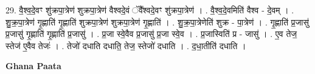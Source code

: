 \documentclass[17pt]{extarticle}
\begin{document}
29. वै॒श्व॒दे॒वꣳ शु॑क्रपा॒त्रेण॑ शुक्रपा॒त्रेण॑ वैश्वदे॒वं ॅवै᳚श्वदे॒वꣳ शु॑क्रपा॒त्रेण॑ । . वै॒श्व॒दे॒वमिति॑ वैश्व - दे॒वम् । . शु॒क्र॒पा॒त्रेण॑ गृ॒ह्णाति॑ गृ॒ह्णाति॑ शुक्रपा॒त्रेण॑ शुक्रपा॒त्रेण॑ गृ॒ह्णाति॑ । . शु॒क्र॒पा॒त्रेणेति॑ शुक्र - पा॒त्रेण॑ । . गृ॒ह्णाति॑ प्र॒जासु॑ प्र॒जासु॑ गृ॒ह्णाति॑ गृ॒ह्णाति॑ प्र॒जासु॑ । . प्र॒जा स्वे॒वैव प्र॒जासु॑ प्र॒जा स्वे॒व । . प्र॒जास्विति॑ प्र - जासु॑ । . ए॒व तेज॒ स्तेज॑ ए॒वैव तेजः॑ । . तेजो॑ दधाति दधाति॒ तेज॒ स्तेजो॑ दधाति । . द॒धा॒तीति॑ दधाति । \newline

\textbf{Ghana Paata } \newline
\end{document}
